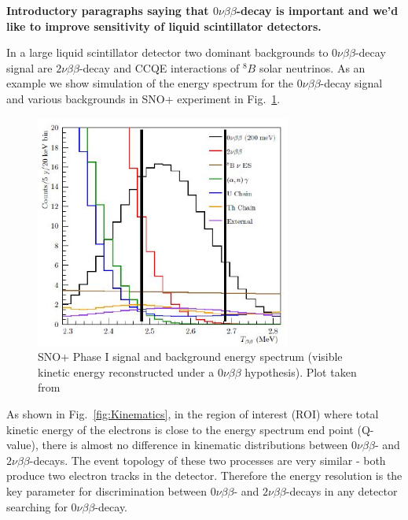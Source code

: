 \documentclass[12pt,twoside,letterpaper]{article}
\newcommand{\vbb}{0\nu\beta\beta}
\newcommand{\vvbb}{2\nu\beta\beta}
\newcommand{\B}{^{8}B}
\begin{document}
{\bf Introductory paragraphs saying that $\vbb$-decay is important and we'd like to improve sensitivity of liquid scintillator detectors.}


In a large liquid scintillator detector two dominant backgrounds to $\vbb$-decay signal are $\vvbb$-decay and CCQE interactions of $\B$ solar neutrinos. As an example we show simulation of the energy spectrum for the $\vbb$-decay signal and various backgrounds in SNO+ experiment in Fig.~\ref{fig:SNOp_bkgs}.


\begin{figure}[htb]
\centering
\includegraphics[angle=0,width=0.75\textwidth]{plots/SNOp_backgrounds.JPG}
\caption{SNO+ Phase I signal and background energy spectrum (visible kinetic energy reconstructed under a $\vbb$ hypothesis). Plot taken from~\cite{SNOp_paper}}
\label{fig:SNOp_bkgs}
\end{figure}

As shown in Fig.~\ref{fig:Kinematics}, in the region of interest (ROI) where total kinetic energy of the electrons is close to the energy spectrum end point (Q-value), there is almost no difference in kinematic distributions between $\vbb$- and $\vvbb$-decays. The event topology of these two processes are very similar - both produce two electron tracks in the detector. Therefore the energy resolution is the key parameter for discrimination between $\vbb$- and $\vvbb$-decays in any detector searching for $\vbb$-decay.
\end{document}
